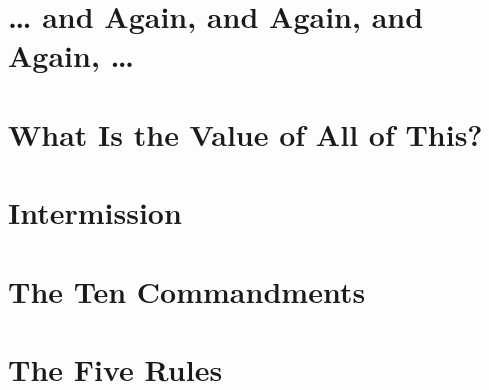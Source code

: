 \documentclass[11pt]{article}
\begin{document}
\newpage

\section{\ldots{} and Again, and Again, and Again, \ldots{}}
\label{sec:org7f9d76b}

\newpage

\section{What Is the Value of All of This?}
\label{sec:org3f866fa}

\newpage

\section{Intermission}
\label{sec:org5025f31}

\newpage

\section{The Ten Commandments}
\label{sec:orgc1e0f08}

\newpage

\section{The Five Rules}
\label{sec:org8b2eb98}

\newpage
\end{document}
